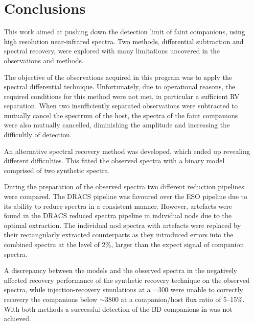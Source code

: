 
\chapter{Conclusions}  %
\label{cha:conclusions}

This work aimed at pushing down the detection limit of faint companions, using high resolution near-infrared spectra.
Two methods, differential subtraction and \textchisquared{} spectral recovery,  were explored with many limitations uncovered in the observations and methods.

The objective of the observations acquired in this program was to apply the spectral differential technique.
Unfortunately, due to operational reasons, the required conditions for this method were not met, in particular a sufficient {RV} separation.
When two insufficiently separated observations were subtracted to mutually cancel the spectrum of the host, the spectra of the faint companions were also mutually cancelled, diminishing the amplitude and increasing the difficultly of detection.

An alternative \textchisquared{} spectral recovery method was developed, which ended up revealing different difficulties.
This fitted the observed spectra with a binary model comprised of two synthetic spectra.

During the preparation of the observed spectra two different reduction pipelines were compared.
The {DRACS} pipeline was favoured over the {ESO} pipeline due to its ability to reduce spectra in a consistent manner.
However, artefacts were found in the {DRACS} reduced spectra pipeline in individual nods due to the optimal extraction.
The individual nod spectra with artefacts were replaced by their rectangularly extracted counterparts as they introduced errors into the combined spectra at the level of 2\%, larger than the expect signal of companion spectra.

A discrepancy between the models and the observed spectra in the \nir{} negatively affected recovery performance of the synthetic recovery technique on the observed spectra, while injection-recovery simulations at a \snr{}=300 were unable to correctly recovery the companions below \(\sim\)3800\K{} at a companion/host flux ratio of 5--15\%.
With both methods a successful detection of the {BD} companions in \nir{} was not achieved.

